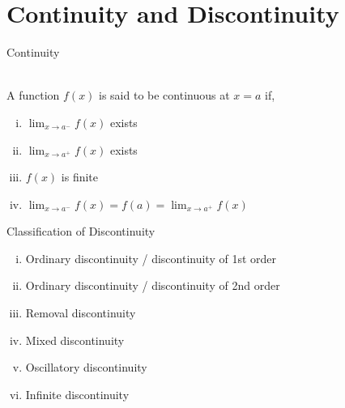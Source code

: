 \documentclass[12pt]{article}
\begin{document}
\section{Continuity and Discontinuity}

\begin{definition}{Continuity}
    
    \\ A function $f(x)$ is said to be continuous at $x=a$ if,
    \begin{enumerate}[(i)]
        \item $\lim_{x \to a^-} f(x)$ exists
        \item $\lim_{x \to a^+} f(x)$ exists
        \item $f(x)$ is finite
        \item $\lim_{x \to a^-} f(x) = f(a) = \lim_{x \to a^+} f(x)$
    \end{enumerate}
\end{definition}

\begin{theorem}{Classification of Discontinuity}

    \begin{enumerate}[(i)]
        \item Ordinary discontinuity / discontinuity of 1st order
        \item Ordinary discontinuity / discontinuity of 2nd order
        \item Removal discontinuity
        \item Mixed discontinuity
        \item Oscillatory discontinuity
        \item Infinite discontinuity
    \end{enumerate}
\end{theorem}
\end{document}
